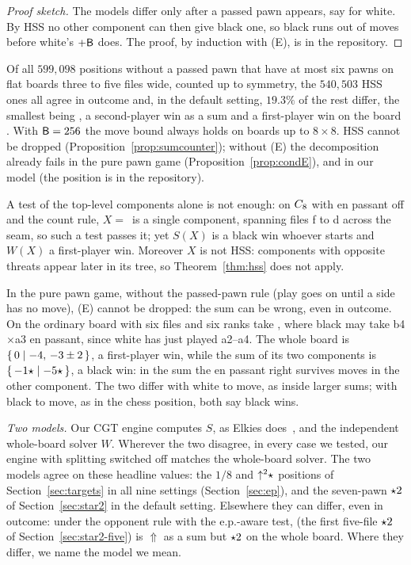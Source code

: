 \begin{proof}[Proof sketch]
The models differ only after a passed pawn appears, say for white. By HSS no other component can then give black
one, so black runs out of moves before white's $+\mathsf{B}$ does. The proof, by induction with (E),
is in the repository.
\end{proof}

Of all $599{,}098$ positions without a passed pawn that have at most six pawns on flat boards three to five
files wide, counted up to symmetry, the $540{,}503$ HSS ones all agree in outcome and, in the default setting, $19.3\%$ of the rest differ, the
smallest being , a second-player win as a sum and a first-player win on the board
. With $\mathsf{B}=256$ the move
bound always holds on boards up to $8\times8$. HSS cannot be dropped (Proposition~\ref{prop:sumcounter});
without (E) the decomposition already fails in the pure pawn game (Proposition~\ref{prop:condE}), and in our model  (the position is in the repository).

\begin{proposition}[\lab{C2}]\label{prop:sumcounter}
A test of the top-level components alone is not enough: on $C_{8}$ with en passant off and the count rule, $X=$\, is a single component, spanning files f to d across the seam, so such a test passes it; yet
$S(X)$ is a black win whoever starts and $W(X)$ a first-player win. Moreover $X$ is not HSS: components with
opposite threats appear later in its tree, so Theorem~\ref{thm:hss} does not apply.
\end{proposition}

\begin{proposition}[\lab{C1}]\label{prop:condE}
In the pure pawn game, without the passed-pawn rule (play goes on until a side has no move), (E) cannot
be dropped: the sum can be wrong, even in outcome. On the ordinary board with six files and six ranks take
, where black may take b4$\times$a3 en passant, since white has just played a2--a4. The
whole board is $\{\,0 \mid -4,\,-3\pm2\,\}$, a first-player win, while the sum of its two components is
$\{\,-1\star \mid -5\star\,\}$, a black win: in the sum the en passant right survives moves in the other component. The two differ
with white to move, as inside larger sums; with black to move, as in the chess position,
both say black wins.
\end{proposition}

\emph{Two models.} Our CGT engine computes $S$, as Elkies does~\cite{Elkies1996}, and the independent
whole-board solver $W$. Wherever the two disagree, in every case we tested,
our engine with splitting switched off matches the whole-board solver. The two models agree on these headline values: the $1/8$ and $\mathord{\uparrow^{2}}\star$
positions of Section~\ref{sec:targets} in all nine settings (Section~\ref{sec:ep}), and the seven-pawn $\mathord{\star2}$
of Section~\ref{sec:star2} in the default setting. Elsewhere they can differ, even in outcome: under the
opponent rule with the e.p.-aware test,  (the first five-file $\mathord{\star2}$ of
Section~\ref{sec:star2-five}) is ${\Uparrow}$ as a sum but $\mathord{\star2}$ on the whole board. Where they differ, we name the model we mean.

